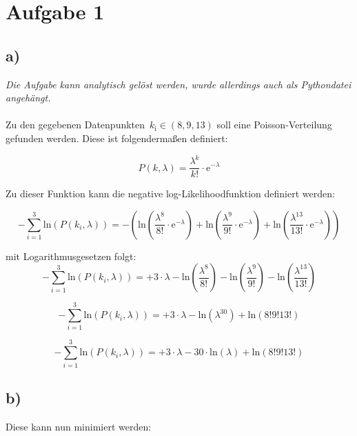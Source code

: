 \section*{Aufgabe 1}
\subsection*{a)}
\textit{Die Aufgabe kann analytisch gelöst werden, wurde allerdings auch als Pythondatei angehängt.} \\~\\
Zu den gegebenen Datenpunkten~$k_\text{i}\in(8,9,13)$ soll eine Poisson-Verteilung gefunden werden. Diese ist folgendermaßen definiert:

\begin{equation*}
P(k, \lambda) = \frac{\lambda^k}{k!}\cdot\mathrm{e}^{-\lambda}
\end{equation*}

Zu dieser Funktion kann die negative log-Likelihoodfunktion definiert werden:

\begin{equation*}
-\sum_{i=1}^3 \mathrm{ln}(P(k_i,\lambda)) = -( \mathrm{ln}(\frac{\lambda^8}{8!}\cdot\mathrm{e}^{-\lambda})+
\mathrm{ln}(\frac{\lambda^9}{9!}\cdot\mathrm{e}^{-\lambda})+
\mathrm{ln}(\frac{\lambda^{13}}{13!}\cdot\mathrm{e}^{-\lambda}))
\end{equation*}

mit Logarithmusgesetzen folgt:
\begin{equation*}
-\sum_{i=1}^3 \mathrm{ln}(P(k_i,\lambda)) = +3\cdot\lambda -\mathrm{ln}\left(\frac{\lambda^8}{8!}\right)-\mathrm{ln}\left(\frac{\lambda^9}{9!}\right) -\mathrm{ln}\left(\frac{\lambda^{13}}{13!}\right)
\end{equation*}

\begin{equation*}
-\sum_{i=1}^3 \mathrm{ln}(P(k_i,\lambda)) = +3\cdot\lambda -\mathrm{ln}(\lambda^{30})+\mathrm{ln}(8!9!13!)
\end{equation*}

\begin{equation*}
-\sum_{i=1}^3 \mathrm{ln}(P(k_i,\lambda)) = +3\cdot\lambda -30\cdot\mathrm{ln}(\lambda)+\mathrm{ln}(8!9!13!)
\end{equation*}

\subsection*{b)}
Diese kann nun minimiert werden:


